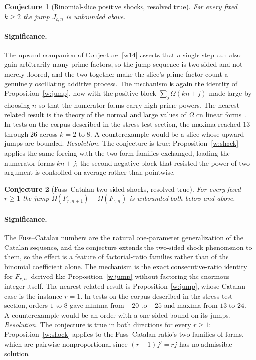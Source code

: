 \documentclass[11pt]{article}
\newtheorem{conjecture}{Conjecture}
\theoremstyle{definition}
\begin{document}
\begin{conjecture}[Binomial-slice positive shocks, resolved true]\label{w15}
For every fixed $k\ge2$ the jump $J_{k,n}$ is unbounded above.
\end{conjecture}

\paragraph{Significance.}
The upward companion of Conjecture~\ref{w14} asserts that a single step can also gain arbitrarily many prime factors, so the jump sequence is two-sided and not merely floored, and the two together make the slice's prime-factor count a genuinely oscillating additive process.  The mechanism is again the identity of Proposition~\ref{w:jump}, now with the positive block $\sum_j\Omega(kn+j)$ made large by choosing $n$ so that the numerator forms carry high prime powers.  The nearest related result is the theory of the normal and large values of $\Omega$ on linear forms~\cite{Ten}.  In tests on the corpus described in the stress-test section, the maxima reached $13$ through $26$ across $k=2$ to $8$.  A counterexample would be a slice whose upward jumps are bounded.  \emph{Resolution.} The conjecture is true: Proposition~\ref{w:shock} applies the same forcing with the two form families exchanged, loading the numerator forms $kn+j$; the second negative block that resisted the power-of-two argument is controlled on average rather than pointwise.

\begin{conjecture}[Fuss--Catalan two-sided shocks, resolved true]\label{w16}
For every fixed $r\ge1$ the jump $\Omega(F_{r,n+1})-\Omega(F_{r,n})$ is unbounded both below and above.
\end{conjecture}

\paragraph{Significance.}
The Fuss--Catalan numbers are the natural one-parameter generalization of the Catalan sequence, and the conjecture extends the two-sided shock phenomenon to them, so the effect is a feature of factorial-ratio families rather than of the binomial coefficient alone.  The mechanism is the exact consecutive-ratio identity for $F_{r,n}$, derived like Proposition~\ref{w:jump} without factoring the enormous integer itself.  The nearest related result is Proposition~\ref{w:jump}, whose Catalan case is the instance $r=1$.  In tests on the corpus described in the stress-test section, orders $1$ to $8$ gave minima from $-20$ to $-25$ and maxima from $13$ to $24$.  A counterexample would be an order with a one-sided bound on its jumps.  \emph{Resolution.} The conjecture is true in both directions for every $r\ge1$: Proposition~\ref{w:shock} applies to the Fuss--Catalan ratio's two families of forms, which are pairwise nonproportional since $(r+1)j'=rj$ has no admissible solution.
\end{document}
